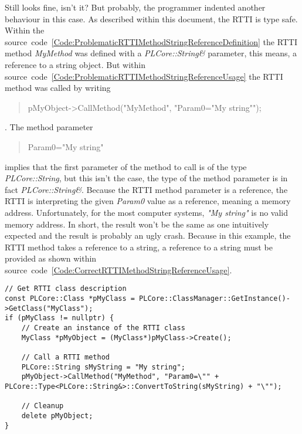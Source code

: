 Still looks fine, isn't it? But probably, the programmer indented another behaviour in this case. As described within this document, the \ac{RTTI} is type safe. Within the source~code~\ref{Code:ProblematicRTTIMethodStringReferenceDefinition} the \ac{RTTI} method \emph{MyMethod} was defined with a \emph{PLCore::String\&} parameter, this means, a reference to a string object. But within source~code~\ref{Code:ProblematicRTTIMethodStringReferenceUsage} the \ac{RTTI} method was called by writing \begin{quote}pMyObject->CallMethod("MyMethod", "Param0="My string"");\end{quote}. The method parameter \begin{quote}Param0="My string"\end{quote} implies that the first parameter of the method to call is of the type \emph{PLCore::String}, but this isn't the case, the type of the method parameter is in fact \emph{PLCore::String\&}. Because the \ac{RTTI} method parameter is a reference, the \ac{RTTI} is interpreting the given \emph{Param0} value as a reference, meaning a memory address. Unfortunately, for the most computer systems, \emph{"My string"} is no valid memory address. In short, the result won't be the same as one intuitively expected and the result is probably an ugly crash. Because in this example, the \ac{RTTI} method takes a reference to a string, a reference to a string must be provided as shown within source~code~\ref{Code:CorrectRTTIMethodStringReferenceUsage}.
\begin{lstlisting}[label=Code:CorrectRTTIMethodStringReferenceUsage,caption={Correct \ac{RTTI} method and string reference parameter usage}]
// Get RTTI class description
const PLCore::Class *pMyClass = PLCore::ClassManager::GetInstance()->GetClass("MyClass");
if (pMyClass != nullptr) {
	// Create an instance of the RTTI class
	MyClass *pMyObject = (MyClass*)pMyClass->Create();

	// Call a RTTI method
	PLCore::String sMyString = "My string";
	pMyObject->CallMethod("MyMethod", "Param0=\"" + PLCore::Type<PLCore::String&>::ConvertToString(sMyString) + "\"");

	// Cleanup
	delete pMyObject;
}
\end{lstlisting}
